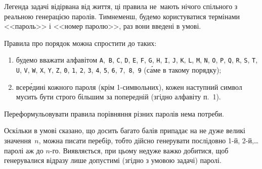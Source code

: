 \documentclass[14pt,a4paper]{extarticle}
\begin{document}
\Tutorial	Легенда задачі відірвана від життя, ці правила не~мають нічого спільного з реальною генерацією паролів. Тим\nolinebreak[2] не\nolinebreak[3] менш, будемо користуватися термінами <<пароль>> і <<номер паролю>>, раз вони введені в умові.

Правила про порядок можна спростити до таких:
\begin{enumerate}
\item
будемо вважати алфавітом \texttt{A},~\texttt{B}, \texttt{C}, \texttt{D}, \texttt{E}, \texttt{F}, \texttt{G}, \texttt{H}, \texttt{I}, \texttt{J}, \texttt{K}, \texttt{L}, \texttt{M}, \texttt{N}, \texttt{O}, \texttt{P}, \texttt{Q}, \texttt{R}, \texttt{S}, \texttt{T}, \texttt{U}, \texttt{V}, \texttt{W}, \texttt{X}, \texttt{Y}, \texttt{Z}, \texttt{0}, \texttt{1}, \texttt{2}, \texttt{3}, \texttt{4}, \texttt{5}, \texttt{6}, \texttt{7},~\texttt{8},~\texttt{9} (с\'{а}ме в такому порядку);
\item
всер\'{е}дині кожного пароля (крім 1-символьних), кожен наступний символ мусить бути строго більшим за попередній (згідно алфавіту п.~1).
\end{enumerate}
Переформульовувати правила порівняння різних паролів нема потреби.

Оскільки в умові сказано, що досить багато балів припадає на не дуже великі значення~$n$, можна писати перебір, тобто дійсно генерувати послідовно \mbox{1-й}, \mbox{2-й},\nolinebreak[3] \dots{} паролі аж до $n$-го. Виявляється, при цьому не\nolinebreak[3] дуже важко добитися, щоб генерувалися відразу лише допустимі (згідно з умовою задачі) паролі.
\end{document}
